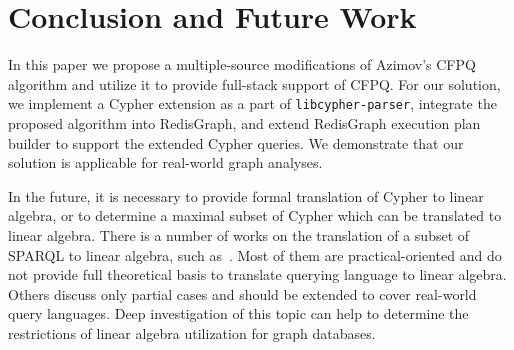 \section{Conclusion and Future Work}
In this paper we propose a multiple-source modifications of Azimov's CFPQ algorithm and utilize it to provide full-stack support of CFPQ.
For our solution, we implement a Cypher extension as a part of \texttt{libcypher-parser}, integrate the proposed algorithm into RedisGraph, and extend RedisGraph execution plan builder to support the extended Cypher queries.
We demonstrate that our solution is applicable for real-world graph analyses.

In the future, it is necessary to provide formal translation of Cypher to linear algebra, or to determine a maximal subset of Cypher which can be translated to linear algebra.
There is a number of works on the translation of a subset of SPARQL to linear algebra, such as~\cite{10.14778/3229863.3236239,10.1007/978-3-642-34002-4_36,DBLP:journals/corr/MetzlerM15a}.
Most of them are practical-oriented and do not provide full theoretical basis to translate querying language to linear algebra.
Others discuss only partial cases and should be extended to cover real-world query languages.
Deep investigation of this topic can help to determine the restrictions of linear algebra utilization for graph databases.


